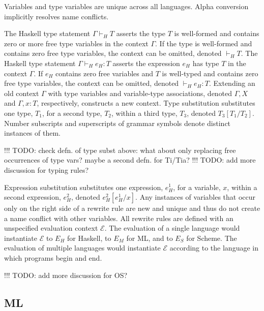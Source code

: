 Variables and type variables are unique across all languages.  Alpha conversion implicitly resolves name conflicts.

The Haskell type statement $\Gamma\vdash_{H}T$ asserts the type $T$ is well-formed and contains zero or more free type variables in the context $\Gamma$.  If the type is well-formed and contains zero free type variables, the context can be omitted, denoted $\vdash_{H}T$.  The Haskell type statement $\Gamma\vdash_{H}e_{H}:T$ asserts the expression $e_{H}$ has type $T$ in the context $\Gamma$.  If $e_{H}$ contains zero free variables and $T$ is well-typed and contains zero free type variables, the context can be omitted, denoted $\vdash_{H}e_{H}:T$.  Extending an old context $\Gamma$ with type variables and variable-type associations, denoted $\Gamma,X$ and $\Gamma,x:T$, respectively, constructs a new context.  Type substitution substitutes one type, $T_{1}$, for a second type, $T_{2}$, within a third type, $T_{3}$, denoted $T_{3}[T_{1}/T_{2}]$.  Number subscripts and superscripts of grammar symbols denote distinct instances of them.

!!! TODO: check defn. of type subst above: what about only replacing free occurrences of type vars?  maybe a second defn. for Ti/Tia?
!!! TODO: add more discussion for typing rules?

Expression substitution substitutes one expression, $e_{H}^{1}$, for a variable, $x$, within a second expression, $e_{H}^{2}$, denoted $e_{H}^{2}[e_{H}^{1}/x]$.  Any instances of variables that occur only on the right side of a rewrite rule are new and unique and thus do not create a name conflict with other variables.  All rewrite rules are defined with an unspecified evaluation context $\mathscr{E}$.  The evaluation of a single language would instantiate $\mathscr{E}$ to $E_{H}$ for Haskell, to $E_{M}$ for ML, and to $E_{S}$ for Scheme.  The evaluation of multiple languages would instantiate $\mathscr{E}$ according to the language in which programs begin and end.

!!! TODO: add more discussion for OS?

\subsection{ML}

